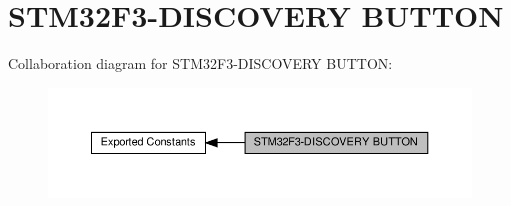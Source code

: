 \hypertarget{group__STM32F3__DISCOVERY__BUTTON}{}\section{S\+T\+M32\+F3-\/\+D\+I\+S\+C\+O\+V\+E\+RY B\+U\+T\+T\+ON}
\label{group__STM32F3__DISCOVERY__BUTTON}
Collaboration diagram for S\+T\+M32\+F3-\/\+D\+I\+S\+C\+O\+V\+E\+RY B\+U\+T\+T\+ON\+:\nopagebreak
\begin{figure}[H]
\begin{center}
\leavevmode
\includegraphics[width=350pt]{group__STM32F3__DISCOVERY__BUTTON}
\end{center}
\end{figure}
